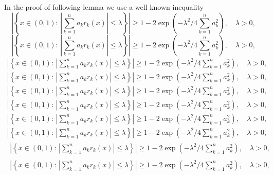 \documentclass{amsart}
\numberwithin{equation}{section}
\begin{document}
In the proof of following lemma we use a well known inequality
{
\begin{equation*} \label{a25}
\left|\left\{x\in (0,1):\, \left|\sum_{k=1}^na_kr_k(x)\right|\le \lambda\right\}\right|\ge 1-2\exp\left( -\lambda^2/4\sum_{k=1}^na_k^2\right),\quad \lambda>0,
 \end{equation*}\fi  
{}\begin{equation}\label{a25}
\left|\left\{x\in (0,1):\, \left|\sum_{k=1}^na_kr_k(x)\right|\le \lambda\right\}\right|\ge 1-2\exp\left( -\lambda^2/4\sum_{k=1}^na_k^2\right),\quad \lambda>0,
\end{equation}\fi   
{}\begin{align*}\label{a25}
\left|\left\{x\in (0,1):\, \left|\sum_{k=1}^na_kr_k(x)\right|\le \lambda\right\}\right|\ge 1-2\exp\left( -\lambda^2/4\sum_{k=1}^na_k^2\right),\quad \lambda>0,
\end{align*}\fi   
{}\begin{align}\label{a25}
\left|\left\{x\in (0,1):\, \left|\sum_{k=1}^na_kr_k(x)\right|\le \lambda\right\}\right|\ge 1-2\exp\left( -\lambda^2/4\sum_{k=1}^na_k^2\right),\quad \lambda>0,
\end{align}\fi    
{}\begin{gather*}\label{a25}
\left|\left\{x\in (0,1):\, \left|\sum_{k=1}^na_kr_k(x)\right|\le \lambda\right\}\right|\ge 1-2\exp\left( -\lambda^2/4\sum_{k=1}^na_k^2\right),\quad \lambda>0,
\end{gather*}\fi  
{}\begin{gather}\label{a25}
\left|\left\{x\in (0,1):\, \left|\sum_{k=1}^na_kr_k(x)\right|\le \lambda\right\}\right|\ge 1-2\exp\left( -\lambda^2/4\sum_{k=1}^na_k^2\right),\quad \lambda>0,
\end{gather}\fi   
{}\begin{multline*}\label{a25}
\left|\left\{x\in (0,1):\, \left|\sum_{k=1}^na_kr_k(x)\right|\le \lambda\right\}\right|\ge 1-2\exp\left( -\lambda^2/4\sum_{k=1}^na_k^2\right),\quad \lambda>0,
\end{multline*}\fi  
{}\begin{multline}\label{a25}
\left|\left\{x\in (0,1):\, \left|\sum_{k=1}^na_kr_k(x)\right|\le \lambda\right\}\right|\ge 1-2\exp\left( -\lambda^2/4\sum_{k=1}^na_k^2\right),\quad \lambda>0,
\end{multline}\fi  
{}\begin{multline*}\begin{split}\label{a25}
\left|\left\{x\in (0,1):\, \left|\sum_{k=1}^na_kr_k(x)\right|\le \lambda\right\}\right|\ge 1-2\exp\left( -\lambda^2/4\sum_{k=1}^na_k^2\right),\quad \lambda>0,
\end{split}\end{multline*}\fi
{}\begin{multline}\begin{split}\label{a25}
\left|\left\{x\in (0,1):\, \left|\sum_{k=1}^na_kr_k(x)\right|\le \lambda\right\}\right|\ge 1-2\exp\left( -\lambda^2/4\sum_{k=1}^na_k^2\right),\quad \lambda>0,
\end{split}\end{multline}\fi
}
\end{document}
